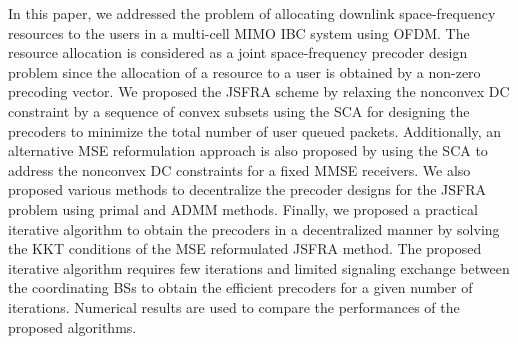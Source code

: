 In this paper, we addressed the problem of allocating downlink space-frequency resources to the users in a multi-cell \ac{MIMO} \ac{IBC} system using \ac{OFDM}. The resource allocation is considered as a joint space-frequency precoder design problem since the allocation of a resource to a user is obtained by a non-zero precoding vector. We proposed the \ac{JSFRA} scheme by relaxing the nonconvex \ac{DC} constraint by a sequence of convex subsets using the \ac{SCA} for designing the precoders to minimize the total number of user queued packets. Additionally, an alternative \ac{MSE} reformulation approach is also proposed by using the \ac{SCA} to address the nonconvex \ac{DC} constraints for a fixed \ac{MMSE} receivers. We also proposed various methods to decentralize the precoder designs for the \ac{JSFRA} problem using primal and \ac{ADMM} methods. Finally, we proposed a practical iterative algorithm to obtain the precoders in a decentralized manner by solving the \ac{KKT} conditions of the \ac{MSE} reformulated \ac{JSFRA} method.  The proposed iterative algorithm requires few iterations and limited signaling exchange between the coordinating \acp{BS} to obtain the efficient precoders for a given number of iterations. Numerical results are used to compare the performances of the proposed algorithms.